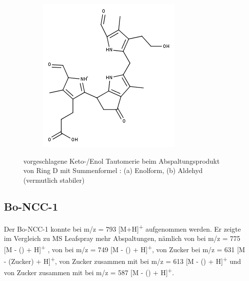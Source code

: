 \begin{figure}[!htbp]
\begin{subfigure}[b]{0.5\textwidth}
    \includegraphics[width=\textwidth]{figures/Kapitel7/Kataboliten/fragmentation_structures/VWA_Katabolit_647-CO2-RingD_480_MH_Ketoform.png}
    \caption{}
    \label{fig:DNCC2991}
  \end{subfigure}
  \caption[vorgeschlagene Keto-/Enoltautomerie der Ring D Abspaltung von Bo-NCC-3, Quelle: Autor]{vorgeschlagene Keto-/Enol Tautomerie beim Abspaltungsprodukt von Ring D mit Summenformel : (a) Enolform, (b) Aldehyd (vermutlich stabiler)}
\end{figure}

\pagebreak
\subsection{Bo-NCC-1} \label{sec:ESIMSBoNCC1}

Der Bo-NCC-1 konnte bei m/z = 793 [M+H]\textsuperscript{+} aufgenommen werden. Er zeigte im Vergleich zu MS Leafspray mehr Abspaltungen, nämlich von  bei m/z = 775 [M - () + H]\textsuperscript{+} , von  bei m/z = 749 [M - () + H]\textsuperscript{+}, von Zucker bei m/z = 631 [M - (Zucker) + H]\textsuperscript{+}, von Zucker zusammen mit  bei m/z = 613 [M - () + H]\textsuperscript{+} und von Zucker zusammen mit  bei m/z = 587 [M - () + H]\textsuperscript{+}. 

